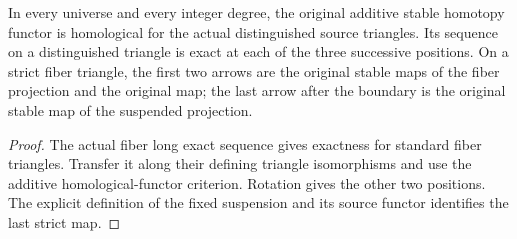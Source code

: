 \begin{proposition}
  \label{prop:actual-stable-homotopy-homological}
  \leanok
  In every universe and every integer degree, the original additive stable homotopy functor is homological for the actual distinguished source triangles. Its sequence on a distinguished triangle is exact at each of the three successive positions. On a strict fiber triangle, the first two arrows are the original stable maps of the fiber projection and the original map; the last arrow after the boundary is the original stable map of the suspended projection.
\end{proposition}
\begin{proof}
  The actual fiber long exact sequence gives exactness for standard fiber triangles. Transfer it along their defining triangle isomorphisms and use the additive homological-functor criterion. Rotation gives the other two positions. The explicit definition of the fixed suspension and its source functor identifies the last strict map.
  \leanok
\end{proof}

